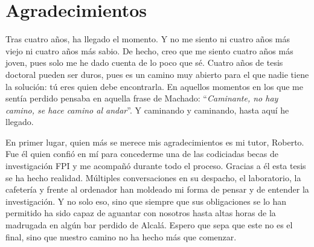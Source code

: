%
%
%
% 
%
%
%
%

\thispagestyle{empty}

\chapter*{Agradecimientos}
\label{ch:agradecimientos}

Tras cuatro años, ha llegado el momento.
Y no me siento ni cuatro años más viejo ni cuatro años más sabio.
De hecho, creo que me siento cuatro años más joven, pues solo me he dado cuenta de lo poco que sé.
Cuatro años de tesis doctoral pueden ser duros, pues es un camino muy abierto para el que nadie tiene la solución: tú eres quien debe encontrarla.
En aquellos momentos en los que me sentía perdido pensaba en aquella frase de Machado: ``\textit{Caminante, no hay camino, se hace camino al andar}''.
Y caminando y caminando, hasta aquí he llegado.

En primer lugar, quien más se merece mis agradecimientos es mi tutor, Roberto.
Fue él quien confió en mí para concederme una de las codiciadas becas de investigación FPI y me acompañó durante todo el proceso.
Gracias a él esta tesis se ha hecho realidad.
Múltiples conversaciones en su despacho, el laboratorio, la cafetería y frente al ordenador han moldeado mi forma de pensar y de entender la investigación.
Y no solo eso, sino que siempre que sus obligaciones se lo han permitido ha sido capaz de aguantar con nosotros hasta altas horas de la madrugada en algún bar perdido de Alcalá.
Espero que sepa que este no es el final, sino que nuestro camino no ha hecho más que comenzar.

